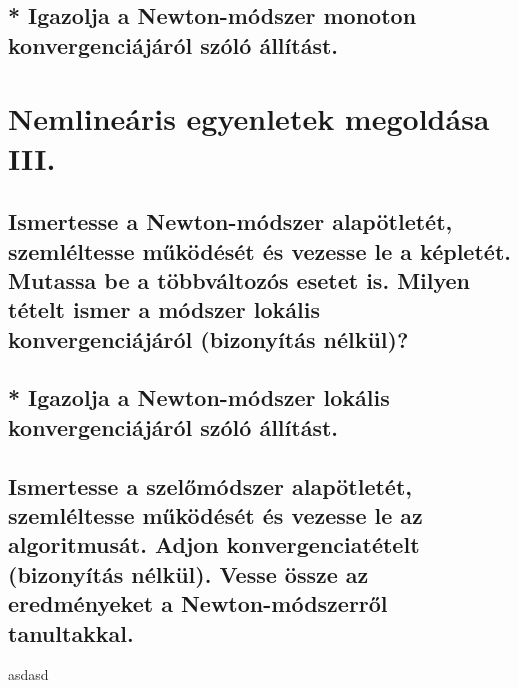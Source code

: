 \documentclass{article}
\begin{document}
        \subsection{* Igazolja a Newton-módszer monoton konvergenciájáról szóló állítást.}


    \section{Nemlineáris egyenletek megoldása III.}
        \subsection{Ismertesse a Newton-módszer alapötletét, szemléltesse működését és vezesse le a képletét. Mutassa be a többváltozós esetet is. Milyen tételt ismer a módszer lokális konvergenciájáról (bizonyítás nélkül)?}
        \subsection{* Igazolja a Newton-módszer lokális konvergenciájáról szóló állítást.}
        \subsection{Ismertesse a szelőmódszer alapötletét, szemléltesse működését és vezesse le az algoritmusát. Adjon konvergenciatételt (bizonyítás nélkül). Vesse össze az eredményeket a Newton-módszerről tanultakkal.}
    
        asdasd
\end{document}
